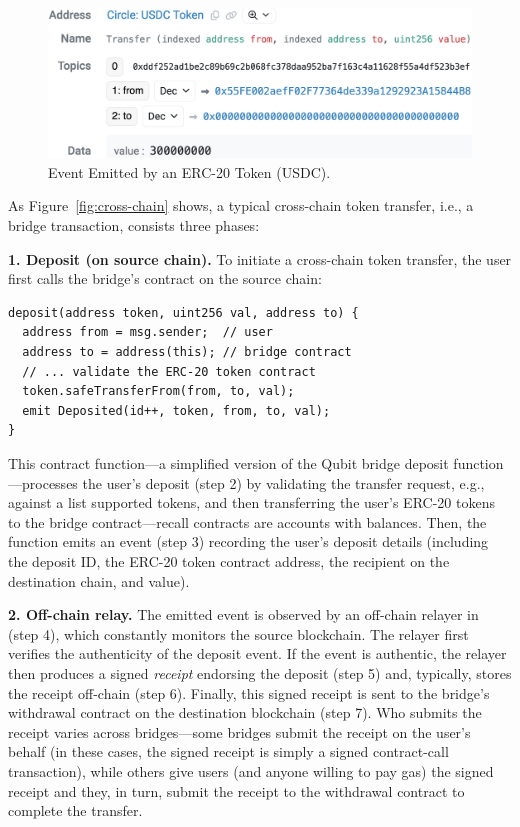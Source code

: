 \begin{figure}[t]
\centering
\includegraphics[width=0.7\columnwidth]{fig/token.png}
\caption{Event Emitted by an ERC-20 Token (USDC).}
\label{fig:erc20-event}
\end{figure}

As Figure~\ref{fig:cross-chain} shows, a typical cross-chain token transfer,
i.e., a bridge transaction, consists three phases:

\textbf{1. Deposit (on source chain).}
To initiate a cross-chain token transfer, the user first calls the bridge's
contract on the source chain:
\begin{lstlisting}
deposit(address token, uint256 val, address to) {
  address from = msg.sender;  // user
  address to = address(this); // bridge contract
  // ... validate the ERC-20 token contract
  token.safeTransferFrom(from, to, val);
  emit Deposited(id++, token, from, to, val);
}
\end{lstlisting}
This contract function---a simplified version of the Qubit bridge deposit
function---processes the user's deposit (step 2) by validating the transfer request,
e.g., against a list supported tokens, and then transferring the user's ERC-20
tokens to the bridge contract---recall contracts are accounts with balances.
Then, the function emits an event (step 3) recording the user's deposit details
(including the deposit ID, the ERC-20 token contract address, the recipient on
the destination chain, and value).

\textbf{2. Off-chain relay.}
The emitted event is observed by an off-chain relayer in (step 4),
which constantly monitors the source blockchain.  The relayer first
verifies the authenticity of the deposit event.  If the event is
authentic, the relayer then produces a signed \emph{receipt}
endorsing the deposit (step 5) and, typically, stores the receipt off-chain (step
6).  Finally, this signed receipt is sent to the bridge's withdrawal contract
on the destination blockchain (step 7). Who submits the receipt varies across
bridges---some bridges submit the receipt on the user's behalf (in these cases, the
signed receipt is simply a signed contract-call transaction), while others give
users (and anyone willing to pay gas) the signed receipt and they, in turn,
submit the receipt to the withdrawal contract to complete the transfer. 

